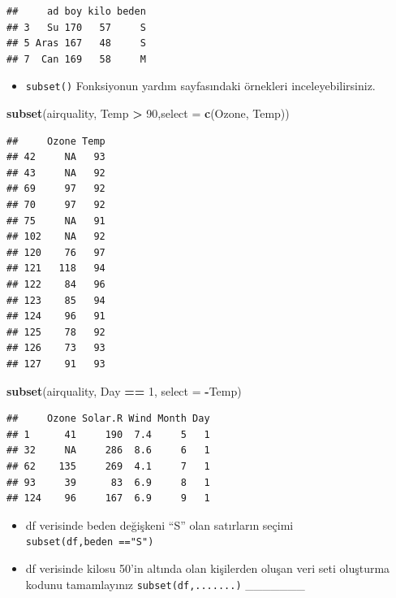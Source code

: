 \documentclass[
  oneside]{book}
\newenvironment{Shaded}{\begin{snugshade}}{\end{snugshade}}
\newcommand{\AttributeTok}[1]{\textcolor[rgb]{0.13,0.29,0.53}{#1}}
\newcommand{\DecValTok}[1]{\textcolor[rgb]{0.00,0.00,0.81}{#1}}
\newcommand{\FunctionTok}[1]{\textcolor[rgb]{0.13,0.29,0.53}{\textbf{#1}}}
\newcommand{\NormalTok}[1]{#1}
\newcommand{\SpecialCharTok}[1]{\textcolor[rgb]{0.81,0.36,0.00}{\textbf{#1}}}
\providecommand{\tightlist}{%
  \setlength{\itemsep}{0pt}\setlength{\parskip}{0pt}}
\begin{document}
\begin{verbatim}
##     ad boy kilo beden
## 3   Su 170   57     S
## 5 Aras 167   48     S
## 7  Can 169   58     M
\end{verbatim}

\begin{itemize}
\tightlist
\item
  \texttt{subset()} Fonksiyonun yardım sayfasındaki örnekleri inceleyebilirsiniz.
\end{itemize}

\begin{Shaded}
\begin{Highlighting}[]
\FunctionTok{subset}\NormalTok{(airquality, Temp }\SpecialCharTok{\textgreater{}} \DecValTok{90}\NormalTok{,}\AttributeTok{select =} \FunctionTok{c}\NormalTok{(Ozone, Temp))}
\end{Highlighting}
\end{Shaded}

\begin{verbatim}
##     Ozone Temp
## 42     NA   93
## 43     NA   92
## 69     97   92
## 70     97   92
## 75     NA   91
## 102    NA   92
## 120    76   97
## 121   118   94
## 122    84   96
## 123    85   94
## 124    96   91
## 125    78   92
## 126    73   93
## 127    91   93
\end{verbatim}

\begin{Shaded}
\begin{Highlighting}[]
\FunctionTok{subset}\NormalTok{(airquality, Day }\SpecialCharTok{==} \DecValTok{1}\NormalTok{, }\AttributeTok{select =} \SpecialCharTok{{-}}\NormalTok{Temp)}
\end{Highlighting}
\end{Shaded}

\begin{verbatim}
##     Ozone Solar.R Wind Month Day
## 1      41     190  7.4     5   1
## 32     NA     286  8.6     6   1
## 62    135     269  4.1     7   1
## 93     39      83  6.9     8   1
## 124    96     167  6.9     9   1
\end{verbatim}

\begin{itemize}
\item
  df verisinde beden değişkeni ``S'' olan satırların seçimi \texttt{subset(df,beden\ =="S")}
\item
  df verisinde kilosu 50'in altında olan kişilerden oluşan veri seti oluşturma kodunu tamamlayınız \texttt{subset(df,.......)} \_\_\_\_\_\_\_
\end{itemize}
\end{document}
